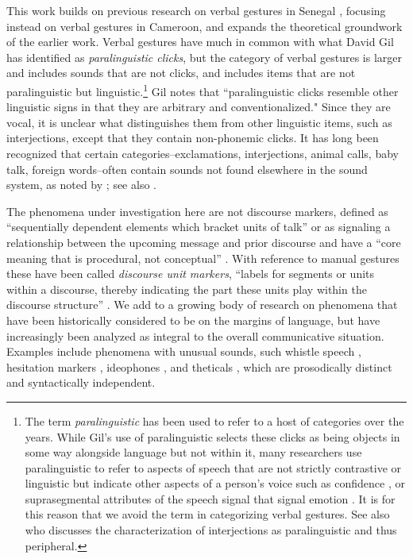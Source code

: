 \documentclass[output=paper
,newtxmath
,modfonts
,nonflat]{langsci/langscibook}
\begin{document}
This work builds on previous research on verbal gestures in Senegal \citep{grenobleetal2015}, focusing instead on verbal gestures in Cameroon, and expands the theoretical groundwork of the earlier work. Verbal gestures have much in common with what David Gil \citep{wals-142} has identified as \textit{paralinguistic clicks}, but the category of verbal gestures is larger and includes sounds that are not clicks, and includes items that are not paralinguistic but linguistic.\footnote{The term \textit{paralinguistic} has been used to refer to a host of categories over the years. While Gil’s use of paralinguistic selects these clicks as being objects in some way alongside language but not within it, many researchers use paralinguistic to refer to aspects of speech that are not strictly contrastive or linguistic but indicate other aspects of a person’s voice such as confidence \citep{Scherer197331}, or suprasegmental attributes of the speech signal that signal emotion \citep{Fujisaki1993}. It is for this reason that we avoid the term in categorizing verbal gestures.  See also \citet[112]{ameka1992} who discusses the characterization of interjections as paralinguistic and thus peripheral. } Gil notes that ``paralinguistic clicks resemble other linguistic signs in that they are arbitrary and conventionalized." Since they are vocal, it is unclear what distinguishes them from other linguistic items, such as interjections, except that they contain non-phonemic clicks. It has long been recognized that certain categories--exclamations, interjections, animal calls, baby talk, foreign words--often contain sounds not found elsewhere in the sound system, as noted by \citep[71]{harris1951}; see also \citep{friespike}.

The phenomena under investigation here are not discourse markers, defined as
 ``sequentially dependent elements which bracket units of talk'' \citep[31]{schiffrin1987}  or as signaling  a relationship between the upcoming message and prior discourse \citep{fraser1990, fraser1996, fraser1999} and have a ``core meaning that is procedural, not conceptual'' \citep[950]{fraser1999}. With reference to manual gestures these have been called \textit{discourse unit markers}, ``labels for segments or units within a discourse, thereby indicating the part these units play within the discourse structure'' \citep[248]{kendon1995}. We add to a growing body of research on phenomena that have been historically considered to be on the margins of language, but have increasingly been analyzed as integral to the overall communicative situation. Examples include phenomena with unusual sounds, such whistle speech \citep{meyer2015, sicoli2016}, hesitation markers \citep{dingemanse2013plos, schegloff1982}, ideophones \citep{childs1994}, and theticals \citep{kaltenbocketal2011}, which are prosodically distinct and syntactically independent.
 
\end{document}
